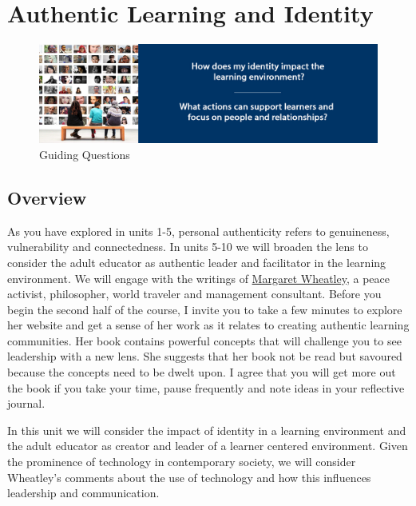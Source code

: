 \documentclass[
]{book}
\begin{document}
\hypertarget{authentic-learning-and-identity}{%
\chapter{Authentic Learning and Identity}\label{authentic-learning-and-identity}}

\begin{figure}
\centering
\includegraphics{assets/unit6/LDRS664-BannerUnit6.jpg}
\caption{Guiding Questions}
\end{figure}

\hypertarget{overview-5}{%
\section*{Overview}\label{overview-5}}

As you have explored in units 1-5, personal authenticity refers to genuineness, vulnerability and connectedness. In units 5-10 we will broaden the lens to consider the adult educator as authentic leader and facilitator in the learning environment. We will engage with the writings of \href{http://margaretwheatley.com/home/}{Margaret Wheatley}, a peace activist, philosopher, world traveler and management consultant. Before you begin the second half of the course, I invite you to take a few minutes to explore her website and get a sense of her work as it relates to creating authentic learning communities. Her book contains powerful concepts that will challenge you to see leadership with a new lens. She suggests that her book not be read but savoured because the concepts need to be dwelt upon. I agree that you will get more out the book if you take your time, pause frequently and note ideas in your reflective journal.

In this unit we will consider the impact of identity in a learning environment and the adult educator as creator and leader of a learner centered environment. Given the prominence of technology in contemporary society, we will consider Wheatley's comments about the use of technology and how this influences leadership and communication.
\end{document}
